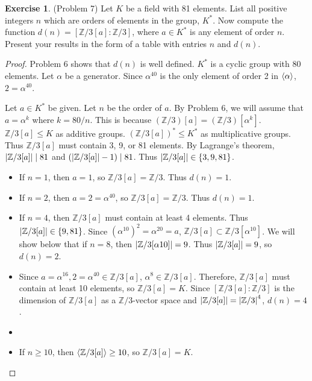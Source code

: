 \documentclass[12pt, psamsfonts]{amsart}
\theoremstyle{definition}
\newtheorem*{exer}{Exercise}
\theoremstyle{remark}
\numberwithin{equation}{section}
\begin{document}
\begin{exer}{(Problem 7)}
  Let $K$ be a field with 81 elements.
  List all positive integers $n$ which are orders of elements in the group, $K^*$.
  Now compute the function $d(n) = [\mathbb{Z}/3[a]:\mathbb{Z}/3]$, where $a \in K^*$ is any element of order $n$.
  Present your results in the form of a table with entries $n$ and $d(n)$.
\end{exer}

\begin{proof}
  Problem 6 shows that $d(n)$ is well defined.
  $K^*$ is a cyclic group with 80 elements.
  Let $\alpha$ be a generator.
  Since $\alpha^{40}$ is the only element of order 2 in $\ev{ \alpha }$, $2 = \alpha^{40}$.

  Let $a \in K^*$ be given.
  Let $n$ be the order of $a$.
  By Problem 6, we will assume that $a = \alpha^k$ where $k = 80 / n$.
  This is because $(\mathbb{Z}/3)[a] = (\mathbb{Z}/3)[\alpha^k]$.
  $\mathbb{Z}/3[a] \leq K$ as additive groups.
  $(\mathbb{Z}/3[a])^* \leq K^*$ as multiplicative groups.
  Thus $\mathbb{Z}/3[a]$ must contain 3, 9, or 81 elements.
  By Lagrange's theorem, $\abs{\mathbb{Z}/3[a]} \mid 81$ and $(\abs{\mathbb{Z}/3[a]} - 1) \mid 81$.
  Thus $\abs{\mathbb{Z}/3[a]} \in \{ 3, 9, 81 \}$.

  \begin{itemize}
    \item
      If $n = 1$, then $a = 1$, so $\mathbb{Z}/3[a] = \mathbb{Z}/3$.
      Thus $d(n) = 1$.
    \item
      If $n = 2$, then $a = 2 = \alpha^{40}$, so $\mathbb{Z}/3[a] = \mathbb{Z}/3$.
      Thus $d(n) = 1$.
    \item
      If $n = 4$, then $\mathbb{Z}/3[a]$ must contain at least 4 elements.
      Thus $\abs{\mathbb{Z}/3[a]} \in \{ 9, 81 \}$.
      Since $(\alpha^{10})^2 = \alpha^{20} = a$, $\mathbb{Z}/3[a] \subset \mathbb{Z}/3[\alpha^{10}]$.
      We will show below that if $n = 8$, then $\abs{\mathbb{Z}/3[\alpha{10}]} = 9$.
      Thus $\abs{\mathbb{Z}/3[a]} = 9$, so $d(n) = 2$.
    \item
      Since $a = \alpha^{16}, 2 = \alpha^{40} \in \mathbb{Z}/3[a]$, $\alpha^8 \in \mathbb{Z}/3[a]$.
      Therefore, $\mathbb{Z}/3[a]$ must contain at least 10 elements, so $\mathbb{Z}/3[a] = K$.
      Since $[\mathbb{Z}/3[a] : \mathbb{Z}/3]$ is the dimension of $\mathbb{Z}/3[a]$ as a $\mathbb{Z}/3$-vector space and $\abs{ \mathbb{Z}/3[a] } = \abs{ \mathbb{Z}/3 }^4$, $d(n) = 4$.
    \item
    \item
      If $n \geq 10$, then $\ev{ \mathbb{Z}/3[a] } \geq 10$, so $\mathbb{Z}/3[a] = K$.


\end{itemize}
\end{proof}
\end{document}

